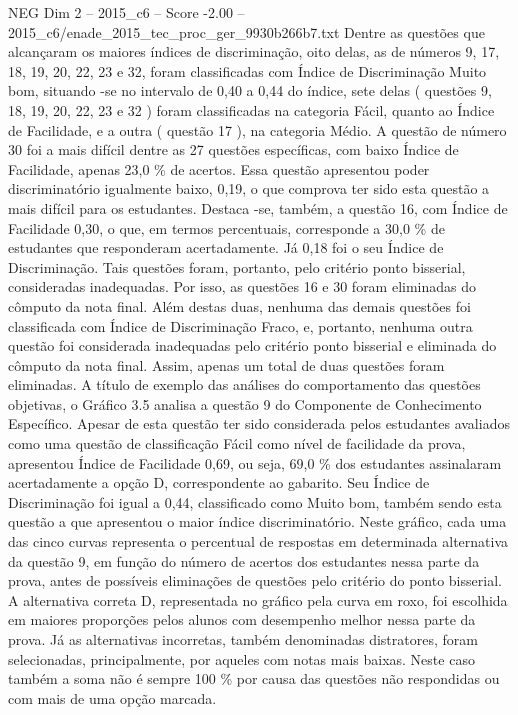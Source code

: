 \begin{textsample}{NEG Dim 2 – 2015\_c6 – Score -2.00 – 2015\_c6/enade\_2015\_tec\_proc\_ger\_9930b266b7.txt}
Dentre as questões que alcançaram os maiores índices de discriminação, oito delas, as de números 9, 17, 18, 19, 20, 22, 23 e 32, foram classificadas com Índice de Discriminação Muito bom, situando -se no intervalo de 0,40 a 0,44 do índice, sete delas ( questões 9, 18, 19, 20, 22, 23 e 32 ) foram classificadas na categoria Fácil, quanto ao Índice de Facilidade, e a outra ( questão 17 ), na categoria Médio.
A questão de número 30 foi a mais difícil dentre as 27 questões específicas, com baixo Índice de Facilidade, apenas 23,0 \% de acertos.
Essa questão apresentou poder discriminatório igualmente baixo, 0,19, o que comprova ter sido esta questão a mais difícil para os estudantes.
Destaca -se, também, a questão 16, com Índice de Facilidade 0,30, o que, em termos percentuais, corresponde a 30,0 \% de estudantes que responderam acertadamente.
Já 0,18 foi o seu Índice de Discriminação.
Tais questões foram, portanto, pelo critério ponto bisserial, consideradas inadequadas.
Por isso, as questões 16 e 30 foram eliminadas do cômputo da nota final.
Além destas duas, nenhuma das demais questões foi classificada com Índice de Discriminação Fraco, e, portanto, nenhuma outra questão foi considerada inadequadas pelo critério ponto bisserial e eliminada do cômputo da nota final.
Assim, apenas um total de duas questões foram eliminadas.
A título de exemplo das análises do comportamento das questões objetivas, o Gráfico 3.5 analisa a questão 9 do Componente de Conhecimento Específico.
Apesar de esta questão ter sido considerada pelos estudantes avaliados como uma questão de classificação Fácil como nível de facilidade da prova, apresentou Índice de Facilidade 0,69, ou seja, 69,0 \% dos estudantes assinalaram acertadamente a opção D, correspondente ao gabarito.
Seu Índice de Discriminação foi igual a 0,44, classificado como Muito bom, também sendo esta questão a que apresentou o maior índice discriminatório.
Neste gráfico, cada uma das cinco curvas representa o percentual de respostas em determinada alternativa da questão 9, em função do número de acertos dos estudantes nessa parte da prova, antes de possíveis eliminações de questões pelo critério do ponto bisserial.
A alternativa correta D, representada no gráfico pela curva em roxo, foi escolhida em maiores proporções pelos alunos com desempenho melhor nessa parte da prova.
Já as alternativas incorretas, também denominadas distratores, foram selecionadas, principalmente, por aqueles com notas mais baixas.
Neste caso também a soma não é sempre 100 \% por causa das questões não respondidas ou com mais de uma opção marcada.

\end{textsample}
